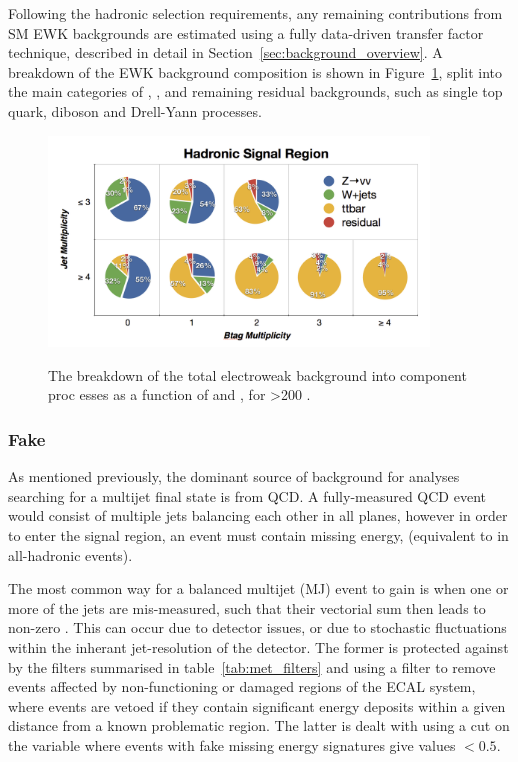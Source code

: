 Following the hadronic selection requirements,
any remaining contributions from SM EWK backgrounds are estimated using a 
fully data-driven transfer factor technique, described in detail in
Section~\ref{sec:background_overview}. A breakdown of the EWK background 
composition is shown in Figure~\ref{fig:background_decomp}, split into the main 
categories of \zinv, \wj, \ttbar and remaining residual backgrounds, such as
single top quark, diboson and Drell-Yann processes.

\begin{figure}[hb!]
\centering
\hspace{0cm}\includegraphics[width=0.9\textwidth, trim=0 00 0 0, clip=true]
{Figs/ra1_had_bg_comp_v3.png}
\label{fig:background_decomp}
\caption{The breakdown of the total electroweak background into component proc
esses as a function of \nj and \nb, for \HT>200 \gev.}
\end{figure}

\subsubsection{Fake \met}

As mentioned previously, the dominant source of background for analyses 
searching for a multijet final state is from QCD. A fully-measured QCD event 
would consist of multiple jets balancing each other in all planes, however in 
order to enter the signal region, an event must contain missing energy, 
\mht (equivalent to \met in all-hadronic events).

The most common way for a balanced multijet (MJ) event to gain \mht is when one 
or more of the jets are mis-measured, such that their vectorial sum then leads to non-zero
\mht. This can occur due to detector issues, or due to stochastic fluctuations
within
the inherant jet-resolution of the 
detector. The former is protected against by the \met filters summarised in 
table~\ref{tab:met_filters} and using a filter to remove events
affected by non-functioning or damaged regions of the ECAL system, where 
events are vetoed if they contain significant energy deposits within a given 
distance from a known problematic region. The latter is dealt with using a
cut on the \alphat variable where 
events with fake missing energy signatures give values $<0.5$.

